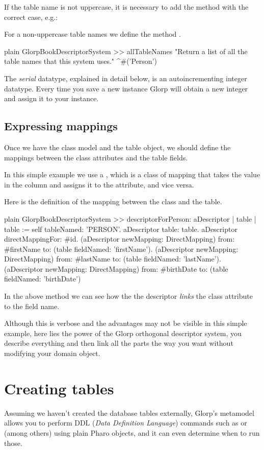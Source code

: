 \documentclass[10pt,twoside,english]{_support/latex/sbabook/sbabook}
\begin{document}
If the table name is not uppercase, it is necessary to add
the method  with the correct case, e.g.:

For a non-uppercase table names we define the method .

\begin{displaycode}{plain}
GlorpBookDescriptorSystem >> allTableNames
	"Return a list of all the table names that this system uses."
	^#('Person')
\end{displaycode}

The \textit{serial} datatype, explained in detail below, is an autoincrementing
integer datatype. Every time you save a new instance Glorp will obtain a
new integer and assign it to your instance.
\subsection{Expressing mappings}
Once we have the class model and the table object, we should define the mappings
between the class attributes and the table fields.

In this simple example we use a , which is a class of
mapping that takes the value in the column and assigns it to the attribute,
and vice versa.

Here is the definition of the mapping between the class and the table.

\begin{displaycode}{plain}
GlorpBookDescriptorSystem >> descriptorForPerson: aDescriptor
	| table |
	table := self tableNamed: 'PERSON'.
	aDescriptor table: table.
	aDescriptor directMappingFor: #id.
	(aDescriptor newMapping: DirectMapping)
		from: #firstName
		to: (table fieldNamed: 'firstName').
	(aDescriptor newMapping: DirectMapping)
		from: #lastName
		to: (table fieldNamed: 'lastName').
	(aDescriptor newMapping: DirectMapping)
		from: #birthDate
		to: (table fieldNamed: 'birthDate')
\end{displaycode}

In the above method we can see how the the descriptor \textit{links} the class
attribute to the field name.

Although this is verbose and the advantages may not be visible in this simple example, here lies the
power of the Glorp orthogonal descriptor system, you describe everything and then
 link all the parts the way you want without modifying your domain object.
\section{Creating tables}
Assuming we haven't created the database tables externally, Glorp's metamodel
allows you to perform DDL (\textit{Data Definition Language}) commands such as
 or  (among others) using plain
Pharo objects, and it can even determine when to run those.
\end{document}
